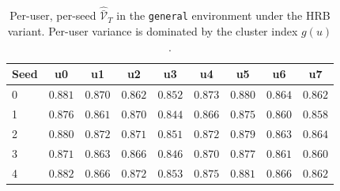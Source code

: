 \documentclass{article} %
\begin{document}
\begin{table}[h]
\centering
\small
\begin{tabular}{lcccccccc}
\toprule
Seed & u0 & u1 & u2 & u3 & u4 & u5 & u6 & u7 \\
\midrule
0 & $0.881$ & $0.870$ & $0.862$ & $0.852$ & $0.873$ & $0.880$ & $0.864$ & $0.862$ \\
1 & $0.876$ & $0.861$ & $0.870$ & $0.844$ & $0.866$ & $0.875$ & $0.860$ & $0.858$ \\
2 & $0.880$ & $0.872$ & $0.871$ & $0.851$ & $0.872$ & $0.879$ & $0.863$ & $0.864$ \\
3 & $0.871$ & $0.863$ & $0.866$ & $0.846$ & $0.870$ & $0.877$ & $0.861$ & $0.860$ \\
4 & $0.882$ & $0.866$ & $0.872$ & $0.853$ & $0.875$ & $0.881$ & $0.866$ & $0.862$ \\
\bottomrule
\end{tabular}
\caption{Per-user, per-seed $\widehat{\bar{\mathcal V}}_T$ in the \texttt{general} environment under the \textnormal{HRB} variant. Per-user variance is dominated by the cluster index $g(u)$.}
\label{tab:app-peruser}
\end{table}

\clearpage
\end{document}
